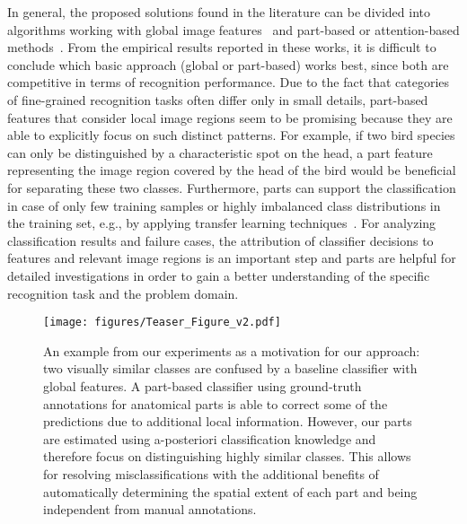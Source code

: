 \documentclass[runningheads]{llncs}
\begin{document}
In general, the proposed solutions found in the literature can be divided into algorithms working with global image features~\cite{lin2015bilinear,Simon19:Implicit} and part-based or attention-based methods~\cite{Fu_2017_CVPR,Ge19Weakly,he2019and,zhang2019unsupervised,zheng2017learning}.
From the empirical results reported in these works, it is difficult to conclude which basic approach (global or part-based) works best, since both are competitive in terms of recognition performance.
Due to the fact that categories of fine-grained recognition tasks often differ only in small details, part-based features that consider local image regions seem to be promising because they are able to explicitly focus on such distinct patterns.
For example, if two bird species can only be distinguished by a characteristic spot on the head, a part feature representing the image region covered by the head of the bird would be beneficial for separating these two classes.
Furthermore, parts can support the classification in case of only few training samples or highly imbalanced class distributions in the training set, e.g., by applying transfer learning techniques~\cite{Goering14:NPT}.
For analyzing classification results and failure cases, the attribution of classifier decisions to features and relevant image regions is an important step and parts are helpful for detailed investigations in order to gain a better understanding of the specific recognition task and the problem domain.

\begin{figure}[t]
	\centering
	\texttt{[image: figures/Teaser\_Figure\_v2.pdf]}
	\caption{An example from our experiments as a motivation for our approach: two visually similar classes are confused by a baseline classifier with global features.
	A part-based classifier using ground-truth annotations for anatomical parts is able to correct some of the predictions due to additional local information.
	However, our parts are estimated using a-posteriori classification knowledge and therefore focus on distinguishing highly similar classes.
	This allows for resolving misclassifications with the additional benefits of automatically determining the spatial extent of each part and being independent from manual annotations.}
	\label{fig:teaser}
\end{figure}
\end{document}
